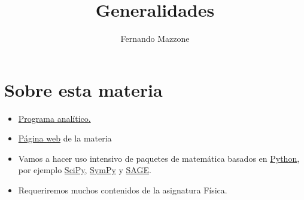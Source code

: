 \documentclass{article}
\title{Generalidades}
\author{Fernando Mazzone}
\newcounter{ejemplo_cont}
\begin{document}
  \maketitle
\tableofcontents


















\section{Sobre esta materia}

\begin{itemize}
 \item  \href{https://docs.google.com/viewer?a=v&pid=sites&srcid=ZGVmYXVsdGRvbWFpbnxlY3VhY2lvbmVzZGlmZXJlbmNpYWxldW5yY3xneDoyZjE0YzJmMDcyODc0ZGQ3}{Programa analítico.}
 \item  \href{https://sites.google.com/site/ecuacionesdiferencialeunrc/ecuaciones-diferenciales-unrc}{Página web} de la materia
 \item  Vamos a hacer uso intensivo de paquetes de matemática basados en \href{https://www.python.org/}{Python}, por ejemplo \href{http://www.scipy.org/}{SciPy},  \href{http://www.scipy.org/}{SymPy} y \href{http://www.sagemath.org/}{SAGE}.
 \item  Requeriremos muchos contenidos de la asignatura Física.

\end{itemize}
\end{document}
